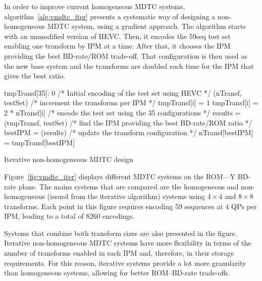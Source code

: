\documentclass[11pt,a4paper,openright,twoside]{book}
\numberwithin{equation}{section} %
\numberwithin{figure}{section} %
\numberwithin{table}{section} %
\begin{document}
In order to improve current homogeneous \ac{MDTC} systems,
algorithm~\ref{alg:vmdtc_iter} presents a systematic way of designing a
non-homogeneous \ac{MDTC} system, using a gradient approach.
The algorithm starts with an unmodified version of \ac{HEVC}.
Then, it encodes the 59seq test set enabling one transform by \ac{IPM} at a
time.
After that, it chooses the \ac{IPM} providing the best \acs{BD}-rate/\acs{ROM}
trade-off.
That configuration is then used as the new base system and the transforms are
doubled each time for the \ac{IPM} that gives the best ratio.

\begin{algorithm}
	\small
	\BlankLine%
	\BlankLine%
	tmpTransf[35]: 0
	\BlankLine%
	/* Initial encoding of the test set using HEVC */
	\BlankLine%
	\encode(nTransf, testSet)
	\BlankLine%
	{
		/* increment the transforms per IPM */
		\BlankLine%
		{
			{
				tmpTransf[i] = 1
			}
			{
				tmpTransf[i] = 2 * nTransf[i]
			}
		}
		\BlankLine%
		/* encode the test set using the 35 configurations */
		\BlankLine%
		results = \encode(tmpTransf, testSet)
		\BlankLine%
		/* find the IPM providing the best BD-rate/ROM ratio */
		\BlankLine%
		bestIPM = \computeBestRatio(results)
		\BlankLine%
		/* update the transform configuration */
		\BlankLine%
		nTransf[bestIPM] = tmpTransf[bestIPM]
	}
	\caption{Iterative non-homogeneous \acs{MDTC} design}
	\label{alg:vmdtc_iter}
\end{algorithm}

Figure~\ref{fig:vmdtc_iter} displays different \ac{MDTC} systems on the
\acs{ROM}---Y \ac{BD}-rate plane.
The mains systems that are compared are the homogeneous and non-homogeneous
(issued from the iterative algorithm) systems using $4\times4$ and $8\times8$
transforms.
Each point in this figure requires encoding 59 sequences at 4 \acp{QP}
per \ac{IPM}, leading to a total of \num{8260} encodings.

Systems that combine both transform sizes are also presented in the figure.
Iterative non-homogeneous \ac{MDTC} systems have more flexibility in terms of
the number of transforms enabled in each \ac{IPM} and, therefore, in their
storage requirements.
For this reason, iterative systems provide a lot more granularity than
homogeneous systems, allowing for better \acs{ROM}--\ac{BD}-rate trade-offs.
\end{document}
